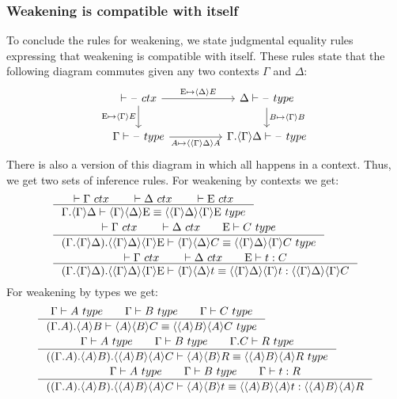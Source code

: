 \subsubsection{Weakening is compatible with itself}
To conclude the rules for weakening, we state judgmental equality rules expressing
that weakening is compatible with itself. These rules state that the following
diagram commutes given any two contexts $\Gamma$ and $\Delta$:
\begin{equation*}
\begin{tikzcd}[column sep=huge]
\jctx{\blank} \ar{r}{\greek{E}\mapsto\ctxwk{\Delta}{E}} \ar{d}[swap]{\greek{E}\mapsto\ctxwk{\Gamma}{E}} & \jtype{\Delta}{\blank} \ar{d}{B\mapsto\ctxwk{\Gamma}{B}}\\
\jtype{\Gamma}{\blank} \ar{r}[swap]{A\mapsto\ctxwk{{\Gamma}{\Delta}}{A}} & \jtype{\ctxext{\Gamma}{\ctxwk{\Gamma}{\Delta}}}{\blank}
\end{tikzcd}
\end{equation*}
There is also a version of this diagram in which all happens in a context. Thus,
we get two sets of inference rules. For weakening by contexts we get:
\begin{align}
& \inference{\jctx{\Gamma}\qquad\jctx{\Delta}\qquad\jctx{\greek{E}}}
          {\jtypeeq{\ctxext{\Gamma}{\ctxwk{\Gamma}{\Delta}}}{\ctxwk{\Gamma}{{\Delta}{\greek{E}}}}
            {\ctxwk{{\Gamma}{\Delta}}{{\Gamma}{\greek{E}}}}}\\
& \inference{\jctx{\Gamma}\qquad\jctx{\Delta}\qquad\jtype{\greek{E}}{C}}
          {\jtypeeq{\ctxext{{\Gamma}{\ctxwk{\Gamma}{\Delta}}}{\ctxwk{{\Gamma}{\Delta}}{{\Gamma}{\greek{E}}}}}
            {\ctxwk{\Gamma}{{\Delta}{C}}}
            {\ctxwk{{\Gamma}{\Delta}}{{\Gamma}{C}}}}\\
& \inference{\jctx{\Gamma}\qquad\jctx{\Delta}\qquad\jterm{\greek{E}}{C}{t}}
          {\jtermeq{\ctxext{{\Gamma}{\ctxwk{\Gamma}{\Delta}}}{\ctxwk{{\Gamma}{\Delta}}{{\Gamma}{\greek{E}}}}}
            {\ctxwk{{\Gamma}{\Delta}}{{\Gamma}{C}}}{\ctxwk{\Gamma}{{\Delta}{t}}}{\ctxwk{{\Gamma}{\Delta}}{{\Gamma}{t}}}}
\end{align}
For weakening by types we get:
\begin{align}
& \inference{\jtype{\Gamma}{A}\qquad\jtype{\Gamma}{B}\qquad\jtype{\Gamma}{C}}
          {\jtypeeq{\ctxext{{\Gamma}{A}}{\ctxwk{A}{B}}}{\ctxwk{A}{{B}{C}}}
            {\ctxwk{{A}{B}}{{A}{C}}}}\\
& \inference{\jtype{\Gamma}{A}\qquad\jtype{\Gamma}{B}\qquad\jtype{\ctxext{\Gamma}{C}}{R}}
          {\jtypeeq{\ctxext{{{\Gamma}{A}}{\ctxwk{A}{B}}}{\ctxwk{{A}{B}}{{A}{C}}}}
            {\ctxwk{A}{{B}{R}}}
            {\ctxwk{{A}{B}}{{A}{R}}}}\\
& \inference{\jtype{\Gamma}{A}\qquad\jtype{\Gamma}{B}\qquad\jterm{\Gamma}{R}{t}}
          {\jtermeq{\ctxext{{{\Gamma}{A}}{\ctxwk{A}{B}}}{\ctxwk{{A}{B}}{{A}{C}}}}
            {\ctxwk{{A}{B}}{{A}{R}}}{\ctxwk{A}{{B}{t}}}{\ctxwk{{A}{B}}{{A}{t}}}}
\end{align}

